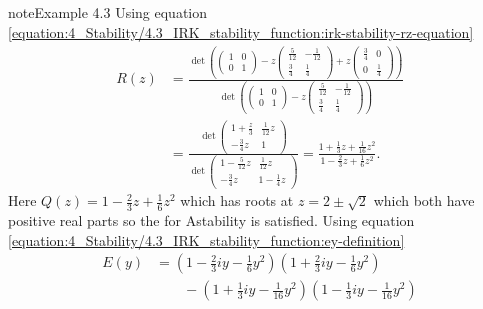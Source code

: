 \documentclass[letterpaper,10pt,english]{jupyterBook}
\begin{document}
\begin{sphinxadmonition}{note}{Example 4.3}
\sphinxAtStartPar
Using equation \eqref{equation:4_Stability/4.3_IRK_stability_function:irk-stability-rz-equation}
\begin{align*}
    R(z) &= \frac{\det \left(
    \begin{pmatrix} 1 & 0 \\ 0 & 1 \end{pmatrix} 
    - z \begin{pmatrix} \frac{5}{12} & -\frac{1}{12} \\ \frac{3}{4} & \frac{1}{4} \end{pmatrix}
    + z \begin{pmatrix} \frac{3}{4} & 0 \\ 0 & \frac{1}{4} \end{pmatrix} \right)}{\det \left(
    \begin{pmatrix} 1 & 0 \\ 0 & 1 \end{pmatrix} - z
    \begin{pmatrix} \frac{5}{12} & -\frac{1}{12} \\ \frac{3}{4} & \frac{1}{4} \end{pmatrix} \right)} \\
    &= \frac{\det \begin{pmatrix} 1 + \frac{z}{3} & \frac{1}{12}z \\ -\frac{3}{4}z & 1 \end{pmatrix}}
    {\det \begin{pmatrix} 1 - \frac{5}{12}z & \frac{1}{12}z \\ -\frac{3}{4}z & 1 - \frac{1}{4}z \end{pmatrix}} 
    = \frac{1 + \frac{1}{3}z + \frac{1}{16}z^2}{1 - \frac{2}{3}z + \frac{1}{6}z^2}.
\end{align*}
\sphinxAtStartPar
Here \(Q(z) = 1 - \frac{2}{3}z + \frac{1}{6}z^2\) which has roots at \(z = 2 \pm \sqrt{2}\) which both have positive real parts so the {\hyperref[\detokenize{4_Stability/4.3_IRK_stability_function:a-stability-theorem}]{}} for A\sphinxhyphen{}stability is satisfied. Using equation \eqref{equation:4_Stability/4.3_IRK_stability_function:ey-definition}
\begin{align*}
    E(y) &= \left( 1 - \frac{2}{3} i y - \frac{1}{6}y^2 \right) \left( 1 + \frac{2}{3} i y - \frac{1}{6}y^2 \right) \\
    & \qquad - \left( 1 + \frac{1}{3} i y - \frac{1}{16} y^2 \right) \left( 1 - \frac{1}{3}i y - \frac{1}{16}y^2 \right) \\

\end{align*}
\end{sphinxadmonition}
\end{document}
